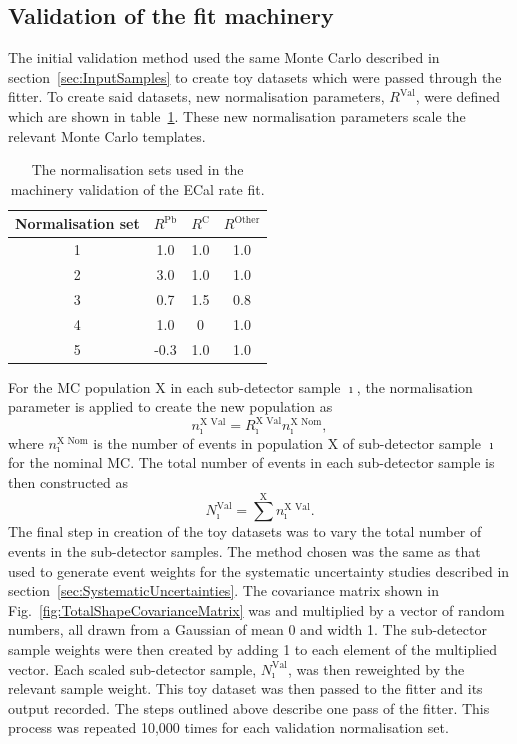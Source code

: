 \subsection{Validation of the fit machinery}
\label{subsec:FitMachineryValidation}
The initial validation method used the same Monte Carlo described in section~\ref{sec:InputSamples} to create toy datasets which were passed through the fitter.  To create said datasets, new normalisation parameters, $R^{\textrm{Val}}$, were defined which are shown in table~\ref{table:ValidationNormalizationSets}.  These new normalisation parameters scale the relevant Monte Carlo templates.  
\begin{table}
  \begin{tabular}{c | c c c }
    Normalisation set & $R^{\textrm{Pb}}$ & $R^{\textrm{C}}$ & $R^{\textrm{Other}}$\\ \hline \hline
    1 & 1.0 & 1.0 & 1.0 \\
    2 & 3.0 & 1.0 & 1.0 \\
    3 & 0.7 & 1.5 & 0.8 \\
    4 & 1.0 & 0 & 1.0 \\
    5 & -0.3 & 1.0 & 1.0 \\
  \end{tabular}
  \caption{The normalisation sets used in the machinery validation of the ECal rate fit.}
  \label{table:ValidationNormalizationSets}
\end{table}
\newline
\newline
For the MC population $\textrm{X}$ in each sub-detector sample $\imath$, the normalisation parameter is applied to create the new population as
\begin{equation}
n^{\textrm{X Val}}_{\imath} = R^{\textrm{X Val}}_{\imath} n^{\textrm{X Nom}}_{\imath},
\label{eq:ValidationScaledPopulation}
\end{equation}
where $n^{\textrm{X Nom}}_{\imath}$ is the number of events in population $\textrm{X}$ of sub-detector sample $\imath$ for the nominal MC.  The total number of events in each sub-detector sample is then constructed as 
\begin{equation}
N^{\textrm{Val}}_{\imath} = \sum^{\textrm{X}} n^{\textrm{X Val}}_{\imath}.
\label{eq:ValidationNEventsDetector}
\end{equation}
The final step in creation of the toy datasets was to vary the total number of events in the sub-detector samples.  The method chosen was the same as that used to generate event weights for the systematic uncertainty studies described in section~\ref{sec:SystematicUncertainties}.  The covariance matrix shown in Fig.~\ref{fig:TotalShapeCovarianceMatrix} was  and multiplied by a vector of random numbers, all drawn from a Gaussian of mean 0 and width 1.  The sub-detector sample weights were then created by adding 1 to each element of the multiplied vector.  Each scaled sub-detector sample, $N^{\textrm{Val}}_{\imath}$, was then reweighted by the relevant sample weight.  This toy dataset was then passed to the fitter and its output recorded.  The steps outlined above describe one pass of the fitter.  This process was repeated 10,000 times for each validation normalisation set.
